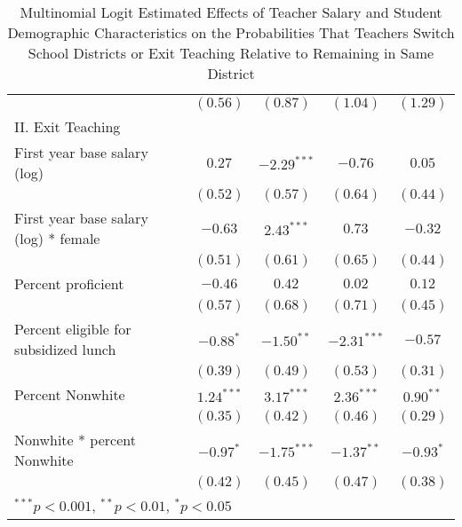 \documentclass[12pt,]{article}
\begin{document}
\begin{sidewaystable}
\begin{center}
\begin{tabular}{l c c c c }
                                                & $(0.56)$      & $(0.87)$      & $(1.04)$      & $(1.29)$     \\
II. Exit Teaching                               &               &               &               &              \\
\quad First year base salary (log)           & $0.27$        & $-2.29^{***}$ & $-0.76$       & $0.05$       \\
                                                & $(0.52)$      & $(0.57)$      & $(0.64)$      & $(0.44)$     \\
\quad First year base salary (log) * female  & $-0.63$       & $2.43^{***}$  & $0.73$        & $-0.32$      \\
                                                & $(0.51)$      & $(0.61)$      & $(0.65)$      & $(0.44)$     \\
\quad Percent proficient                     & $-0.46$       & $0.42$        & $0.02$        & $0.12$       \\
                                                & $(0.57)$      & $(0.68)$      & $(0.71)$      & $(0.45)$     \\
\quad Percent eligible for subsidized lunch  & $-0.88^{*}$   & $-1.50^{**}$  & $-2.31^{***}$ & $-0.57$      \\
                                                & $(0.39)$      & $(0.49)$      & $(0.53)$      & $(0.31)$     \\
\quad Percent Nonwhite                       & $1.24^{***}$  & $3.17^{***}$  & $2.36^{***}$  & $0.90^{**}$  \\
                                                & $(0.35)$      & $(0.42)$      & $(0.46)$      & $(0.29)$     \\
\quad Nonwhite * percent Nonwhite            & $-0.97^{*}$   & $-1.75^{***}$ & $-1.37^{**}$  & $-0.93^{*}$  \\
                                                & $(0.42)$      & $(0.45)$      & $(0.47)$      & $(0.38)$     \\
\hline
\multicolumn{5}{l}{\scriptsize{$^{***}p<0.001$, $^{**}p<0.01$, $^*p<0.05$}}
\end{tabular}
\caption{Multinomial Logit Estimated Effects of Teacher Salary and Student Demographic Characteristics on the Probabilities That Teachers Switch School Districts or Exit Teaching Relative to Remaining in Same District}
\label{tbl:reg_mlogit}
\end{center}
\end{sidewaystable}
\end{document}

